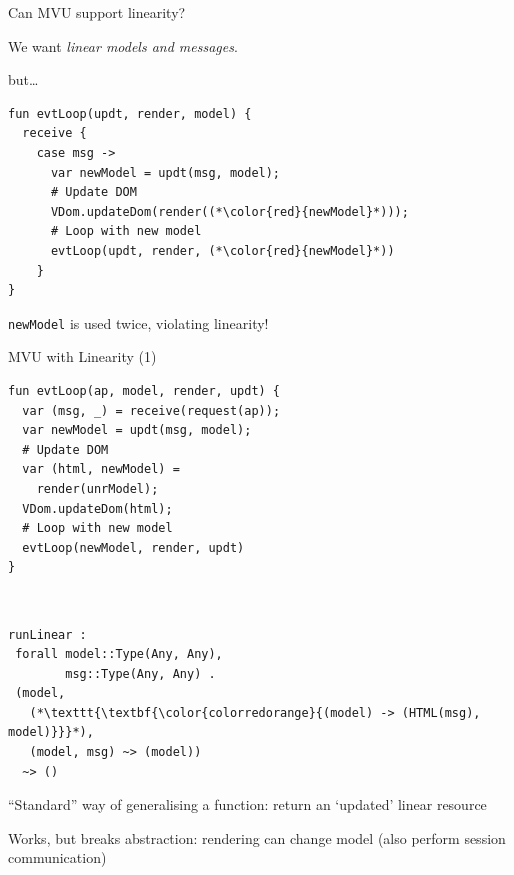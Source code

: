 \documentclass[11.5pt, aspectratio=169]{beamer}
\begin{document}
\begin{frame}[fragile]{Can MVU support linearity?}

  \begin{fullpageitemize}
  \item We want \emph{linear models and messages}.
    \begin{itemize}
      \itemR but\ldots
    \end{itemize}
  \end{fullpageitemize}

  \begin{lstlisting}[language=links]
fun evtLoop(updt, render, model) {
  receive {
    case msg ->
      var newModel = updt(msg, model);
      # Update DOM
      VDom.updateDom(render((*\color{red}{newModel}*)));
      # Loop with new model
      evtLoop(updt, render, (*\color{red}{newModel}*))
    }
}
  \end{lstlisting}

  \begin{fullpageitemize}
    \item \texttt{newModel} is used twice, violating linearity!
  \end{fullpageitemize}
\end{frame}

\begin{frame}[fragile]{MVU with Linearity (1)}

\begin{minipage}{0.55\textwidth}
  \begin{lstlisting}[language=links]
fun evtLoop(ap, model, render, updt) {
  var (msg, _) = receive(request(ap));
  var newModel = updt(msg, model);
  # Update DOM
  var (html, newModel) =
    render(unrModel);
  VDom.updateDom(html);
  # Loop with new model
  evtLoop(newModel, render, updt)
}
  \end{lstlisting}
\end{minipage}
~
\begin{minipage}{0.42\textwidth}
  \begin{lstlisting}[numbers=none, backgroundcolor=\color{white}]
runLinear :
 forall model::Type(Any, Any),
        msg::Type(Any, Any) .
 (model,
   (*\texttt{\textbf{\color{colorredorange}{(model) -> (HTML(msg), model)}}}*),
   (model, msg) ~> (model))
  ~> ()
\end{lstlisting}
\end{minipage}

  \begin{fullpageitemize}
  \item ``Standard'' way of generalising a function: return an `updated' linear resource
  \item Works, but breaks abstraction: rendering can change model (also perform session communication)
  \end{fullpageitemize}
\end{frame}
\end{document}

